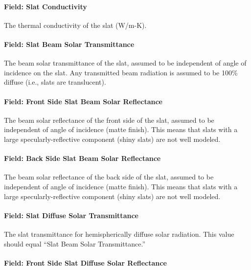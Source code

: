\paragraph{Field: Slat Conductivity}\label{field-slat-conductivity}

The thermal conductivity of the slat (W/m-K).

\paragraph{Field: Slat Beam Solar Transmittance}\label{field-slat-beam-solar-transmittance}

The beam solar transmittance of the slat, assumed to be independent of angle of incidence on the slat. Any transmitted beam radiation is assumed to be 100\% diffuse (i.e., slats are translucent).

\paragraph{Field: Front Side Slat Beam Solar Reflectance}\label{field-front-side-slat-beam-solar-reflectance}

The beam solar reflectance of the front side of the slat, assumed to be independent of angle of incidence (matte finish). This means that slats with a large specularly-reflective component (shiny slats) are not well modeled.

\paragraph{Field: Back Side Slat Beam Solar Reflectance}\label{field-back-side-slat-beam-solar-reflectance}

The beam solar reflectance of the back side of the slat, assumed to be independent of angle of incidence (matte finish). This means that slats with a large specularly-reflective component (shiny slats) are not well modeled.

\paragraph{Field: Slat Diffuse Solar Transmittance}\label{field-slat-diffuse-solar-transmittance}

The slat transmittance for hemispherically diffuse solar radiation. This value should equal ``Slat Beam Solar Transmittance.''

\paragraph{Field: Front Side Slat Diffuse Solar Reflectance}\label{field-front-side-slat-diffuse-solar-reflectance}

